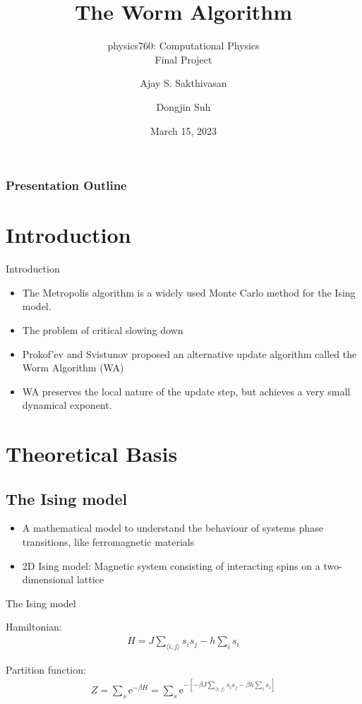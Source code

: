 \documentclass{beamer}
\title{The Worm Algorithm}
\subtitle{physics760: Computational Physics\\Final Project}
\author{Ajay S. Sakthivasan \and Dongjin Suh}
\institute{Universität Bonn}
\date{March 15, 2023}
\begin{document}
\begin{frame}
    \titlepage
\end{frame}

\begin{frame}
    \frametitle{Presentation Outline}
    \tableofcontents
\end{frame}

\section{Introduction}
\begin{frame}{Introduction}
    \begin{itemize}
        \item The Metropolis algorithm is a widely used Monte Carlo method for the Ising model.
        \item The problem of critical slowing down
        \item Prokof’ev and Svistunov proposed an alternative update algorithm called the Worm Algorithm (WA)
        \item WA preserves the local nature of the update step, but achieves a very small dynamical exponent.
    \end{itemize}
\end{frame}

\section{Theoretical Basis}
\subsection{The Ising model}
\begin{itemize}
    \item A mathematical model to understand the behaviour of systems phase transitions, like ferromagnetic materials
    \item 2D Ising model: Magnetic system consisting of interacting spins on a two-dimensional lattice
\end{itemize}
\begin{frame}{The Ising model}

Hamiltonian: 
    \begin{align*}
    H = J\sum_{\langle i,j \rangle} s_{i}s_{j} - h\sum_{i} s_{i}
\end{align*}

Partition function: 
\begin{align*}
    Z = \sum_{s} \mathrm{e}^{-\beta H} = \sum_{s} \mathrm{e}^{-[-\beta J \sum_{\langle i,j \rangle}s_i s_j - \beta h \sum_{i}s_i]}
\end{align*}
\end{frame}
\end{document}
